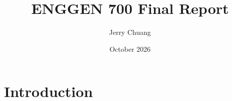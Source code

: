 \documentclass{article}
\title{ENGGEN 700 Final Report}
\author{Jerry Chuang}
\date{October 2026}
\begin{document}
\maketitle

\section{Introduction}
\end{document}
